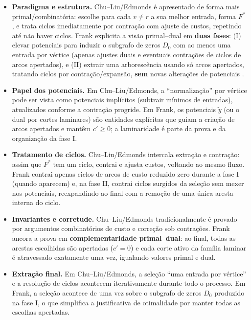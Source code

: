 \documentclass[12pt,a4paper]{article}
\def\emph#1{#1}%
\begin{document}
\begin{itemize}\setlength{\itemsep}{2pt}
    \item \textbf{Paradigma e estrutura.} \emph{Chu–Liu/Edmonds} é apresentado de forma mais \emph{primal/combinatória}: escolhe para cada \(v\neq r\) a sua melhor entrada, forma \(F^*\), e trata ciclos imediatamente por contração com ajuste de custos, repetindo até não haver ciclos. \emph{Frank} explicita a visão \emph{primal–dual} em \textbf{duas fases}: (I) elevar potenciais para induzir o subgrafo de zeros \(D_0\) com ao menos uma entrada por vértice (apenas ajustes duais e eventuais contrações de ciclos de arcos apertados), e (II) extrair uma arborescência usando \emph{só} arcos apertados, tratando ciclos por contração/expansão, \textbf{sem} novas alterações de potenciais \cite{frank1981,frank2014,schrijver2003comb}.
    \item \textbf{Papel dos potenciais.} Em \emph{Chu–Liu/Edmonds}, a “normalização” por vértice pode ser vista como potenciais \emph{implícitos} (subtrair mínimos de entradas), atualizados conforme a contração progride. Em \emph{Frank}, os potenciais \(\tilde y\) (ou o dual por cortes laminares) são entidades \emph{explícitas} que guiam a criação de arcos apertados e mantêm \(c'\ge 0\); a laminaridade é parte da prova e da organização da fase I.
    \item \textbf{Tratamento de ciclos.} \emph{Chu–Liu/Edmonds} intercala extração e contração: assim que \(F^*\) tem um ciclo, contrai e ajusta custos, voltando ao mesmo fluxo. \emph{Frank} contrai apenas ciclos de arcos de custo reduzido zero durante a fase I (quando aparecem) e, na fase II, contrai ciclos surgidos da seleção \emph{sem} mexer nos potenciais, reexpandindo ao final com a remoção de uma única aresta interna do ciclo.
    \item \textbf{Invariantes e corretude.} \emph{Chu–Liu/Edmonds} tradicionalmente é provado por argumentos combinatórios de custo e correção sob contrações. \emph{Frank} ancora a prova em \textbf{complementaridade primal–dual}: ao final, todas as arestas escolhidas são \emph{apertadas} (\(c'=0\)) e cada corte ativo da família laminar é atravessado exatamente uma vez, igualando valores primal e dual.
    \item \textbf{Extração final.} Em \emph{Chu–Liu/Edmonds}, a seleção “uma entrada por vértice” e a resolução de ciclos acontecem iterativamente durante todo o processo. Em \emph{Frank}, a seleção acontece de uma vez sobre o subgrafo de zeros \(D_0\) produzido na fase I, o que simplifica a justificativa de otimalidade por manter todas as escolhas \emph{apertadas}.

\end{itemize}
\end{document}
